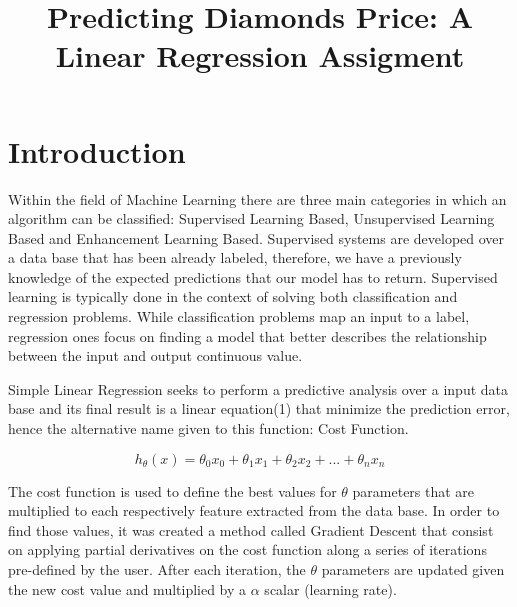 \documentclass[conference]{IEEEtran}
\begin{document}
\title{Predicting Diamonds Price: A Linear Regression Assigment}

\author{
\and
{}
}

\maketitle

\section{Introduction}

Within the field of Machine Learning there are three main categories in which an algorithm can be classified: Supervised Learning Based, Unsupervised Learning Based and Enhancement Learning Based. Supervised systems are developed over a data base that has been already labeled, therefore, we have a previously knowledge of the expected predictions that our model has to return. Supervised learning is typically done in the context of solving both classification and regression problems.
While classification problems map an input to a label, regression ones focus on finding a model that better describes the relationship between the input and output continuous value.\par

Simple Linear Regression seeks to perform a predictive analysis over a input data base and its final result is a linear equation(1) that minimize the prediction error, hence the alternative name given to this function: Cost Function.

\begin{equation}
h_\theta(x)= \theta_0 x_0 + \theta_1 x_1 + \theta_2 x_2 + ... + \theta_n x_n
\end{equation}

The cost function is used to define the best values for $\theta$ parameters that are multiplied to each respectively feature extracted from the data base. In order to find those values, it was created a method called Gradient Descent that consist on applying partial derivatives on the cost function along a series of iterations pre-defined by the user. After each iteration, the $\theta$ parameters are updated given the new cost value and multiplied by a $\alpha$ scalar (learning rate).
\end{document}
